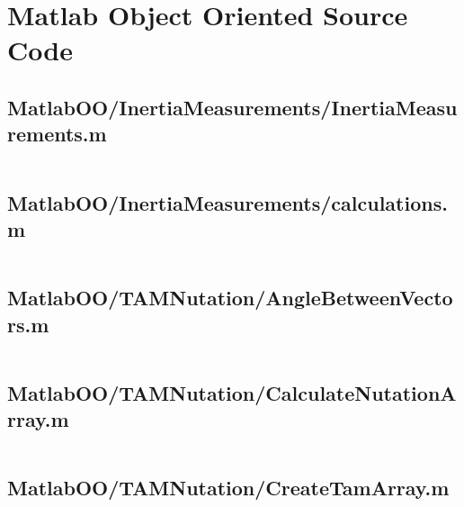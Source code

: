 
\chapter{Matlab Object Oriented Source Code}
\label{ch:MatlabObjectOrientedSourceCode}

\linespread{1}

\pagebreak
\section*{MatlabOO/InertiaMeasurements/InertiaMeasurements.m}\label{code:MatlabOO/InertiaMeasurements/InertiaMeasurements.m}
\inputminted[linenos,fontsize=\scriptsize]{matlab}{/home/dcouture/git/mathyourlife/TSatPy/beta_versions/matlab_object_oriented/InertiaMeasurements/InertiaMeasurements.m}

\pagebreak
\section*{MatlabOO/InertiaMeasurements/calculations.m}\label{code:MatlabOO/InertiaMeasurements/calculations.m}
\inputminted[linenos,fontsize=\scriptsize]{matlab}{/home/dcouture/git/mathyourlife/TSatPy/beta_versions/matlab_object_oriented/InertiaMeasurements/calculations.m}

\pagebreak
\section*{MatlabOO/TAMNutation/AngleBetweenVectors.m}\label{code:MatlabOO/TAMNutation/AngleBetweenVectors.m}
\inputminted[linenos,fontsize=\scriptsize]{matlab}{/home/dcouture/git/mathyourlife/TSatPy/beta_versions/matlab_object_oriented/TAMNutation/AngleBetweenVectors.m}

\pagebreak
\section*{MatlabOO/TAMNutation/CalculateNutationArray.m}\label{code:MatlabOO/TAMNutation/CalculateNutationArray.m}
\inputminted[linenos,fontsize=\scriptsize]{matlab}{/home/dcouture/git/mathyourlife/TSatPy/beta_versions/matlab_object_oriented/TAMNutation/CalculateNutationArray.m}

\pagebreak
\section*{MatlabOO/TAMNutation/CreateTamArray.m}\label{code:MatlabOO/TAMNutation/CreateTamArray.m}
\inputminted[linenos,fontsize=\scriptsize]{matlab}{/home/dcouture/git/mathyourlife/TSatPy/beta_versions/matlab_object_oriented/TAMNutation/CreateTamArray.m}

